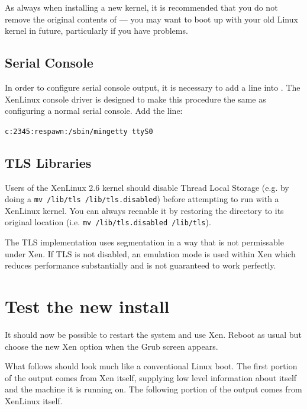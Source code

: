 \documentclass[11pt,twoside,final,openright]{xenstyle}
\begin{document}
As always when installing a new kernel, it is recommended that you do
not remove the original contents of  --- you may want
to boot up with your old Linux kernel in future, particularly if you
have problems.


\subsection{Serial Console}

In order to configure serial console output, it is necessary to add a
line into .  The XenLinux console driver is
designed to make this procedure the same as configuring a normal
serial console.  Add the line:

{\tt c:2345:respawn:/sbin/mingetty ttyS0}

\subsection{TLS Libraries}

Users of the XenLinux 2.6 kernel should disable Thread Local Storage
(e.g. by doing a {\tt mv /lib/tls /lib/tls.disabled}) before
attempting to run with a XenLinux kernel.  You can always reenable it
by restoring the directory to its original location (i.e. {\tt mv
  /lib/tls.disabled /lib/tls}).

The TLS implementation uses segmentation in a way that is not
permissable under Xen.  If TLS is not disabled, an emulation mode is
used within Xen which reduces performance substantially and is not
guaranteed to work perfectly.

\section{Test the new install}

It should now be possible to restart the system and use Xen.  Reboot
as usual but choose the new Xen option when the Grub screen appears.

What follows should look much like a conventional Linux boot.  The
first portion of the output comes from Xen itself, supplying low level
information about itself and the machine it is running on.  The
following portion of the output comes from XenLinux itself.
\end{document}
